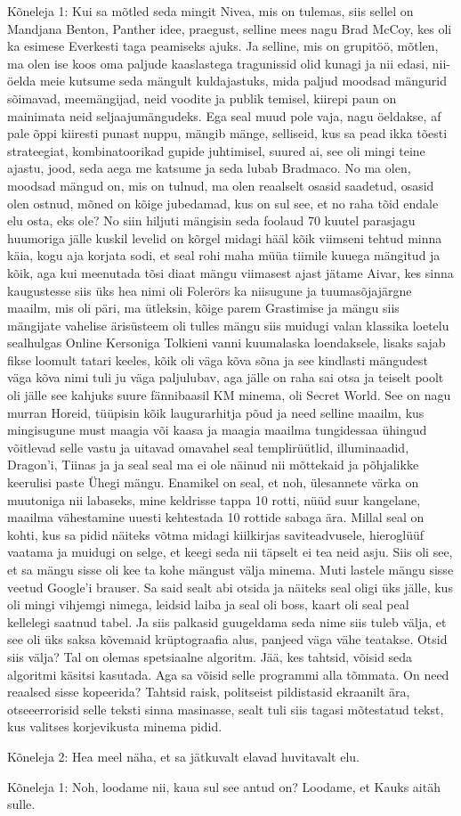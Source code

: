 Kõneleja 1:
Kui sa mõtled seda mingit Nivea, mis on tulemas, siis sellel on Mandjana Benton, Panther idee, praegust, selline mees nagu Brad McCoy, kes oli ka esimese Everkesti taga peamiseks ajuks. Ja selline, mis on grupitöö, mõtlen, ma olen ise koos oma paljude kaaslastega tragunissid olid kunagi ja nii edasi, nii-öelda meie kutsume seda mängult kuldajastuks, mida paljud moodsad mängurid sõimavad, meemängijad, neid voodite ja publik temisel, kiirepi paun on mainimata neid seljaajumängudeks. Ega seal muud pole vaja, nagu öeldakse, af pale õppi kiiresti punast nuppu, mängib mänge, selliseid, kus sa pead ikka tõesti strateegiat, kombinatoorikad gupide juhtimisel, suured ai, see oli mingi teine ajastu, jood, seda aega me katsume ja seda lubab Bradmaco. No ma olen, moodsad mängud on, mis on tulnud, ma olen reaalselt osasid saadetud, osasid olen ostnud, mõned on kõige jubedamad, kus on sul see, et no raha tõid endale elu osta, eks ole? No siin hiljuti mängisin seda foolaud 70 kuutel parasjagu huumoriga jälle kuskil levelid on kõrgel midagi hääl kõik viimseni tehtud minna käia, kogu aja korjata sodi, et seal rohi maha müüa tiimile kuuega mängitud ja kõik, aga kui meenutada tõsi diaat mängu viimasest ajast jätame Aivar, kes sinna kaugustesse siis üks hea nimi oli Folerörs ka niisugune ja tuumasõjajärgne maailm, mis oli päri, ma ütleksin, kõige parem Grastimise ja mängu siis mängijate vahelise ärisüsteem oli tulles mängu siis muidugi valan klassika loetelu sealhulgas Online Kersoniga Tolkieni vanni kuumalaska loendaksele, lisaks sajab fikse loomult tatari keeles, kõik oli väga kõva sõna ja see kindlasti mängudest väga kõva nimi tuli ju väga paljulubav, aga jälle on raha sai otsa ja teiselt poolt oli jälle see kahjuks suure fännibaasil KM minema, oli Secret World. See on nagu murran Horeid, tüüpisin kõik laugurarhitja põud ja need selline maailm, kus mingisugune must maagia või kaasa ja maagia maailma tungidessaa ühingud võitlevad selle vastu ja uitavad omavahel seal templirüütlid, illuminaadid, Dragon'i, Tiinas ja ja seal seal ma ei ole näinud nii mõttekaid ja põhjalikke keerulisi paste Ühegi mängu. Enamikel on seal, et noh, ülesannete värka on muutoniga nii labaseks, mine keldrisse tappa 10 rotti, nüüd suur kangelane, maailma vähestamine uuesti kehtestada 10 rottide sabaga ära.
Millal seal on kohti, kus sa pidid näiteks võtma midagi kiilkirjas saviteadvusele, hieroglüüf vaatama ja muidugi on selge, et keegi seda nii täpselt ei tea neid asju. Siis oli see, et sa mängu sisse oli kee ta kohe mängust välja minema. Muti lastele mängu sisse veetud Google'i brauser. Sa said sealt abi otsida ja näiteks seal oligi üks jälle, kus oli mingi vihjemgi nimega, leidsid laiba ja seal oli boss, kaart oli seal peal kellelegi saatnud tabel. Ja siis palkasid guugeldama seda nime siis tuleb välja, et see oli üks saksa kõvemaid krüptograafia alus, panjeed väga vähe teatakse. Otsid siis välja? Tal on olemas spetsiaalne algoritm. Jää, kes tahtsid, võisid seda algoritmi käsitsi kasutada. Aga sa võisid selle programmi alla tõmmata. On need reaalsed sisse kopeerida? Tahtsid raisk, politseist pildistasid ekraanilt ära, otseeerrorisid selle teksti sinna masinasse, sealt tuli siis tagasi mõtestatud tekst, kus valitses korjevikusta minema pidid.
                 
Kõneleja 2:
Hea meel näha, et sa jätkuvalt elavad huvitavalt elu.
                 
Kõneleja 1:
Noh, loodame nii, kaua sul see antud on? Loodame, et Kauks aitäh sulle.
